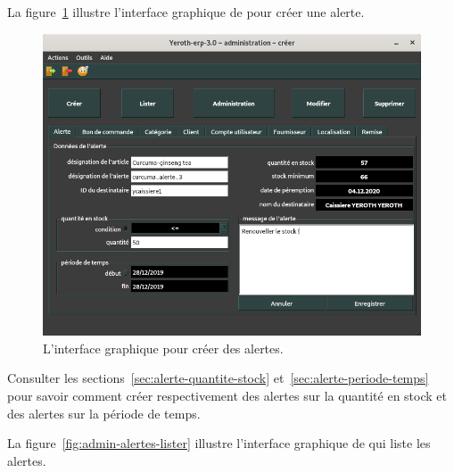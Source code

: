 
\newpage
{}\label{sec:administration-alertes-creer}

La figure~\ref{fig:admin-alertes-creer} illustre l'interface
graphique de \yeroth pour cr\'eer une alerte.\\

\begin{figure}[!htpb]
	\centering
	\includegraphics[scale=0.45]{images/alerte-creer.png}
	\caption{L'interface graphique pour cr\'eer des alertes.}
	\label{fig:admin-alertes-creer}
\end{figure}

Consulter les sections~\ref{sec:alerte-quantite-stock}
et~\ref{sec:alerte-periode-temps} pour savoir comment
cr\'eer respectivement des alertes sur la quantit\'e en
stock et des alertes sur la p\'eriode de temps.


\newpage
{}\label{sec:administration-alertes-lister}

La figure~\ref{fig:admin-alertes-lister} illustre l'interface
graphique de \yeroth qui liste les alertes.\\

